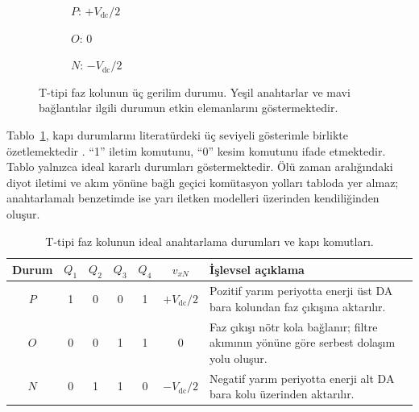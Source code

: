 \begin{figure}[htbp]
  \centering
  \begin{subfigure}[t]{0.32\textwidth}
    \centering
    \caption{$P$: $+V_{\mathrm{dc}}/2$}
  \end{subfigure}\hfill
  \begin{subfigure}[t]{0.32\textwidth}
    \centering
    \caption{$O$: $0$}
  \end{subfigure}\hfill
  \begin{subfigure}[t]{0.32\textwidth}
    \centering
    \caption{$N$: $-V_{\mathrm{dc}}/2$}
  \end{subfigure}
  \caption{T-tipi faz kolunun üç gerilim durumu. Yeşil anahtarlar ve mavi bağlantılar ilgili durumun etkin elemanlarını göstermektedir.}
  \label{fig:t-tipi-uc-seviye}
\end{figure}

Tablo~\ref{tab:t-tipi-durumlar}, kapı durumlarını literatürdeki üç seviyeli gösterimle birlikte özetlemektedir \citep{Holmes2003,Wang2020}. ``1'' iletim komutunu, ``0'' kesim komutunu ifade etmektedir. Tablo yalnızca ideal kararlı durumları göstermektedir. Ölü zaman aralığındaki diyot iletimi ve akım yönüne bağlı geçici komütasyon yolları tabloda yer almaz; anahtarlamalı benzetimde ise yarı iletken modelleri üzerinden kendiliğinden oluşur.

\begin{table}[htbp]
  \centering
  \caption{T-tipi faz kolunun ideal anahtarlama durumları ve kapı komutları.}
  \label{tab:t-tipi-durumlar}
  \small
  \begin{tabularx}{\textwidth}{c c c c c c X}
    \toprule
    Durum & $Q_1$ & $Q_2$ & $Q_3$ & $Q_4$ & $v_{xN}$ & İşlevsel açıklama \\
    \midrule
    $P$ & 1 & 0 & 0 & 1 & $+V_{\mathrm{dc}}/2$ & Pozitif yarım periyotta enerji üst DA bara kolundan faz çıkışına aktarılır. \\
    $O$ & 0 & 0 & 1 & 1 & $0$ & Faz çıkışı nötr kola bağlanır; filtre akımının yönüne göre serbest dolaşım yolu oluşur. \\
    $N$ & 0 & 1 & 1 & 0 & $-V_{\mathrm{dc}}/2$ & Negatif yarım periyotta enerji alt DA bara kolu üzerinden aktarılır. \\
    \bottomrule
  \end{tabularx}
\end{table}

